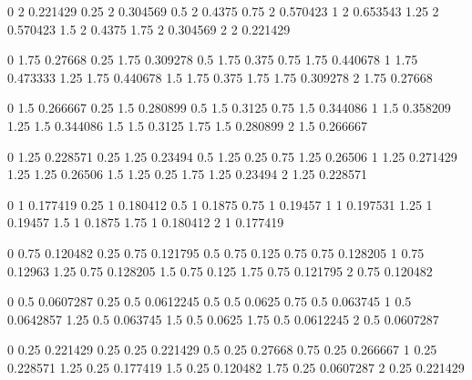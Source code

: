 0   2   0.221429
 0.25   2   0.304569
 0.5   2   0.4375
 0.75   2   0.570423
 1   2   0.653543
 1.25   2   0.570423
 1.5   2   0.4375
 1.75   2   0.304569
 2   2   0.221429

 0   1.75   0.27668
 0.25   1.75   0.309278
 0.5   1.75   0.375
 0.75   1.75   0.440678
 1   1.75   0.473333
 1.25   1.75   0.440678
 1.5   1.75   0.375
 1.75   1.75   0.309278
 2   1.75   0.27668

 0   1.5   0.266667
 0.25   1.5   0.280899
 0.5   1.5   0.3125
 0.75   1.5   0.344086
 1   1.5   0.358209
 1.25   1.5   0.344086
 1.5   1.5   0.3125
 1.75   1.5   0.280899
 2   1.5   0.266667

 0   1.25   0.228571
 0.25   1.25   0.23494
 0.5   1.25   0.25
 0.75   1.25   0.26506
 1   1.25   0.271429
 1.25   1.25   0.26506
 1.5   1.25   0.25
 1.75   1.25   0.23494
 2   1.25   0.228571

 0   1   0.177419
 0.25   1   0.180412
 0.5   1   0.1875
 0.75   1   0.19457
 1   1   0.197531
 1.25   1   0.19457
 1.5   1   0.1875
 1.75   1   0.180412
 2   1   0.177419

 0   0.75   0.120482
 0.25   0.75   0.121795
 0.5   0.75   0.125
 0.75   0.75   0.128205
 1   0.75   0.12963
 1.25   0.75   0.128205
 1.5   0.75   0.125
 1.75   0.75   0.121795
 2   0.75   0.120482

 0   0.5   0.0607287
 0.25   0.5   0.0612245
 0.5   0.5   0.0625
 0.75   0.5   0.063745
 1   0.5   0.0642857
 1.25   0.5   0.063745
 1.5   0.5   0.0625
 1.75   0.5   0.0612245
 2   0.5   0.0607287

 0   0.25   0.221429
 0.25   0.25   0.221429
 0.5   0.25   0.27668
 0.75   0.25   0.266667
 1   0.25   0.228571
 1.25   0.25   0.177419
 1.5   0.25   0.120482
 1.75   0.25   0.0607287
 2   0.25   0.221429